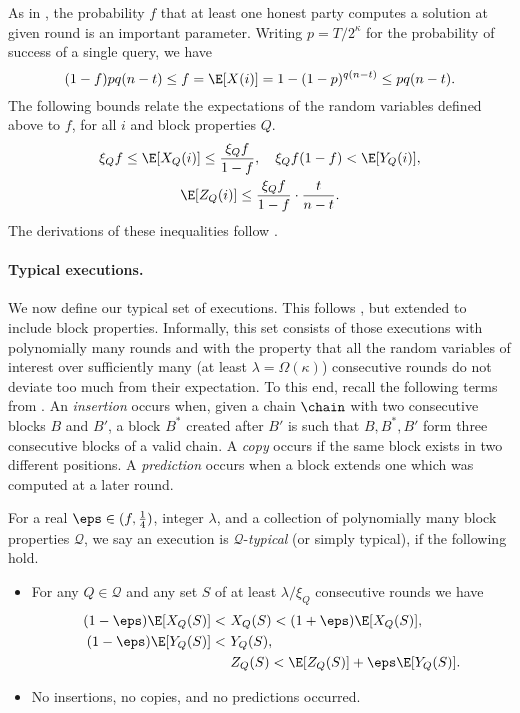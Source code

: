 As in \cite{backbone}, the probability $f$ that at least one honest party
computes a solution at given round is an important parameter.
Writing $p=T/2^\kappa$ for the probability of success of a single query, we
have
\[
	(1-f){pq(n-t)}\le f=\E[X(i)]=1-(1-p)^{q(n-t)}\le pq(n-t)
.\]
The following bounds relate the expectations of the random variables defined
above to $f$, for all $i$ and block properties $Q$.
\begin{gather*}
	\xi_Q f\le\E[X_Q(i)]\le\frac{\xi_Q f}{1-f},\quad
		\xi_Q f(1-f)<\E[Y_Q(i)],\\
	\E[Z_Q(i)]\le\frac{\xi_Q f}{1-f}\cdot\frac t{n-t}
.\end{gather*}
The derivations of these inequalities follow \cite{backbone-new}.

\paragraph{Typical executions.} %
We now define our typical set of executions. This follows \cite{backbone-new}, but
extended to include block properties.
Informally, this set consists of
those executions with polynomially many rounds and with the property that all
the random variables of interest over sufficiently many (at least
$\lambda=\Omega(\kappa)$) consecutive rounds do not deviate too much from
their expectation.
To this end, recall the following terms from \cite{backbone-new}. An
\emph{insertion} occurs when, given a chain $\chain$ with two consecutive
blocks $B$ and $B'$, a block $B^*$ created after $B'$ is such that $B,B^*,B'$
form three consecutive blocks of a valid chain. A \emph{copy} occurs if the
same block exists in two different positions. A \emph{prediction} occurs when
a block extends one which was computed at a later round.

\begin{definition}\label{def:typical}
	For a real $\eps\in(f,\frac14)$, integer $\lambda$, and
	a collection of polynomially many block properties $\mathcal{Q}$, we say an
	execution is $\mathcal{Q}$-\emph{typical} (or simply typical), if the following
	hold.
	\begin{itemize}
		\item
			For any $Q\in\mathcal{Q}$ and any set $S$ of at least $\lambda/\xi_Q$
			consecutive rounds we have
			\begin{align}
				(1-\eps)\E[X_Q(S)]<~&X_Q(S)<(1+\eps)\E[X_Q(S)],
				\\(1-\eps)\E[Y_Q(S)]<~&Y_Q(S),
				\\&Z_Q(S)<\E[Z_Q(S)]+\eps\E[Y_Q(S)].
			\end{align}
		\item
			No insertions, no copies, and no predictions occurred.
	\end{itemize}
\end{definition}%

